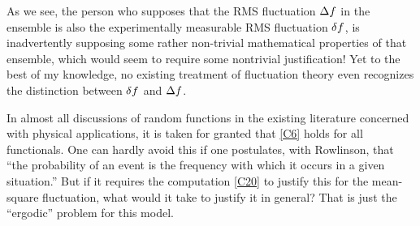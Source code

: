 As we see, the person who supposes that the RMS fluctuation $\mathop{}\!\Delta f$ in the ensemble is also the experimentally measurable RMS fluctuation $\mathop{}\!\delta f$, is inadvertently supposing some rather non-trivial mathematical properties of that ensemble, which would seem to require some nontrivial justification!
Yet to the best of my knowledge, no existing treatment of fluctuation theory even recognizes the distinction between $\mathop{}\!\delta f$ and $\mathop{}\!\Delta f$.

In almost all discussions of random functions in the existing literature concerned with physical applications, it is taken for granted that \eqref{C6} holds for all functionals.
One can hardly avoid this if one postulates, with Rowlinson, that ``the probability of an event is the frequency with which it occurs in a given situation.''
But if it requires the computation \eqref{C20} to justify this for the mean-square fluctuation, what would it take to justify it in general?
That is just the ``ergodic'' problem for this model.

